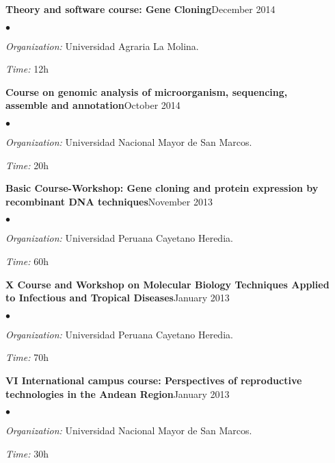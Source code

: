 \documentclass[margin,line]{res}
\newenvironment{list2}{
  \begin{list}{$\bullet$}{%
      \setlength{\itemsep}{0in}
      \setlength{\parsep}{0in} \setlength{\parskip}{0in}
      \setlength{\topsep}{0in} \setlength{\partopsep}{0in}
      \setlength{\leftmargin}{0.2in}}}{\end{list}}
\begin{document}
\begin{resume}
{\bf Theory and software course: Gene Cloning}\hfill {December 2014}\\
\vspace*{-.1in}
\begin{list2} %
	\item \textit{Organization:} Universidad Agraria La Molina.
	\item \textit{Time:} 12h
\end{list2}

{\bf Course on genomic analysis of microorganism, sequencing, \\assemble and annotation}\hfill {October 2014}\\
\vspace*{-.1in}
\begin{list2} %
	\item \textit{Organization:} Universidad Nacional Mayor de San Marcos.
	\item \textit{Time:} 20h
\end{list2}

{\bf Basic Course-Workshop: Gene cloning and protein expression by \\recombinant DNA techniques}\hfill {November 2013}\\
\vspace*{-.1in}
\begin{list2} %
	\item \textit{Organization:} Universidad Peruana Cayetano Heredia.
	\item \textit{Time:} 60h
\end{list2}

{\bf X Course and Workshop on Molecular Biology Techniques Applied \\to Infectious and Tropical Diseases}\hfill {January 2013}\\
\vspace*{-.1in}
\begin{list2} %
	\item \textit{Organization:} Universidad Peruana Cayetano Heredia.
	\item \textit{Time:} 70h
\end{list2}

{\bf VI International campus course: Perspectives of reproductive \\technologies in the Andean Region}\hfill {January 2013}\\
\vspace*{-.1in}
\begin{list2} %
	\item \textit{Organization:} Universidad Nacional Mayor de San Marcos.
	\item \textit{Time:} 30h\\
\end{list2}


\end{resume}
\end{document}
